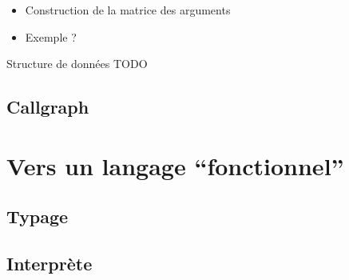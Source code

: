 \begin{frame}
  \frametitle{}
  \begin{block}{}
    \begin{itemize}
      \item Construction de la matrice des arguments
      \item Exemple ?
    \end{itemize}
  \end{block}
  \begin{block}{Structure de données}
    TODO
  \end{block}
\end{frame}

\subsection{Callgraph}

\begin{frame}
  \frametitle{}
  \begin{block}{}
  \end{block}
\end{frame}

\section{Vers un langage ``fonctionnel''}

\subsection{Typage}

\begin{frame}
  \frametitle{}
  \begin{block}{}
  \end{block}
\end{frame}

\subsection{Interprète}

\begin{frame}
  \frametitle{}
  \begin{block}{}
  \end{block}
\end{frame}
